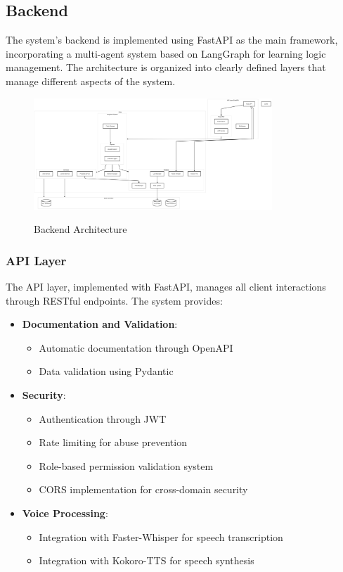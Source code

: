 \subsection{Backend}
\label{backend}

The system's backend is implemented using FastAPI as the main framework, incorporating a multi-agent system based on LangGraph for learning logic management. The architecture is organized into clearly defined layers that manage different aspects of the system.

\begin{figure}[H]
	\centering
	\includegraphics[width=0.8\textwidth]{figuras/backend.png}
	\label{fig:arquitectura-backend}
	\caption{Backend Architecture}
\end{figure}

\subsubsection{API Layer}
\label{capa-api}

The API layer, implemented with FastAPI, manages all client interactions through RESTful endpoints. The system provides:

\begin{itemize}
    \item \textbf{Documentation and Validation}:
    \begin{itemize}
        \item Automatic documentation through OpenAPI
        \item Data validation using Pydantic
    \end{itemize}

    \item \textbf{Security}:
    \begin{itemize}
        \item Authentication through JWT
        \item Rate limiting for abuse prevention
        \item Role-based permission validation system
        \item CORS implementation for cross-domain security
    \end{itemize}

    \item \textbf{Voice Processing}:
    \begin{itemize}
        \item Integration with Faster-Whisper for speech transcription
        \item Integration with Kokoro-TTS for speech synthesis
    \end{itemize}
\end{itemize}
